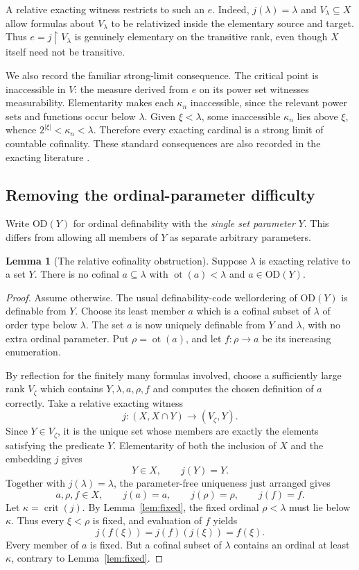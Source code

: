 \documentclass[11pt,letterpaper]{article}
\theoremstyle{definition}
\newtheorem{lemma}[definition]{Lemma}
\newcommand{\OD}{\mathrm{OD}}
\newcommand{\crit}{\operatorname{crit}}
\newcommand{\ot}{\operatorname{ot}}
\newcommand{\restr}{\mathbin{\upharpoonright}}
\begin{document}
A relative exacting witness restricts to such an $e$. Indeed, $j(\lambda)=\lambda$ and $V_\lambda\subseteq X$ allow formulas about $V_\lambda$ to be relativized inside the elementary source and target. Thus $e=j\restr V_\lambda$ is genuinely elementary on the transitive rank, even though $X$ itself need not be transitive.

We also record the familiar strong-limit consequence. The critical point is inaccessible in $V$: the measure derived from $e$ on its power set witnesses measurability. Elementarity makes each $\kappa_n$ inaccessible, since the relevant power sets and functions occur below $\lambda$. Given $\xi<\lambda$, some inaccessible $\kappa_n$ lies above $\xi$, whence $2^{|\xi|}<\kappa_n<\lambda$. Therefore every exacting cardinal is a strong limit of countable cofinality. These standard consequences are also recorded in the exacting literature \cite{abl,cover}.

\subsection{Removing the ordinal-parameter difficulty}

Write $\OD(Y)$ for ordinal definability with the \emph{single set parameter} $Y$. This differs from allowing all members of $Y$ as separate arbitrary parameters.

\begin{lemma}[The relative cofinality obstruction]\label{lem:relative}
Suppose $\lambda$ is exacting relative to a set $Y$. There is no cofinal $a\subseteq\lambda$ with $\ot(a)<\lambda$ and $a\in\OD(Y)$.
\end{lemma}

\begin{proof}
Assume otherwise. The usual definability-code wellordering of $\OD(Y)$ is definable from $Y$. Choose its least member $a$ which is a cofinal subset of $\lambda$ of order type below $\lambda$. The set $a$ is now uniquely definable from $Y$ and $\lambda$, with no extra ordinal parameter. Put $\rho=\ot(a)$, and let $f:\rho\to a$ be its increasing enumeration.

By reflection for the finitely many formulas involved, choose a sufficiently large rank $V_\zeta$ which contains $Y,\lambda,a,\rho,f$ and computes the chosen definition of $a$ correctly. Take a relative exacting witness
\[
        j:(X,X\cap Y)\longrightarrow(V_\zeta,Y).
\]
Since $Y\in V_\zeta$, it is the unique set whose members are exactly the elements satisfying the predicate $Y$. Elementarity of both the inclusion of $X$ and the embedding $j$ gives
\[
       Y\in X,\qquad j(Y)=Y.
\]
Together with $j(\lambda)=\lambda$, the parameter-free uniqueness just arranged gives
\[
 a,\rho,f\in X,\qquad j(a)=a,\qquad j(\rho)=\rho,
 \qquad j(f)=f.
\]
Let $\kappa=\crit(j)$. By Lemma~\ref{lem:fixed}, the fixed ordinal $\rho<\lambda$ must lie below $\kappa$. Thus every $\xi<\rho$ is fixed, and evaluation of $f$ yields
\[
       j(f(\xi))=j(f)(j(\xi))=f(\xi).
\]
Every member of $a$ is fixed. But a cofinal subset of $\lambda$ contains an ordinal at least $\kappa$, contrary to Lemma~\ref{lem:fixed}.
\end{proof}
\end{document}
